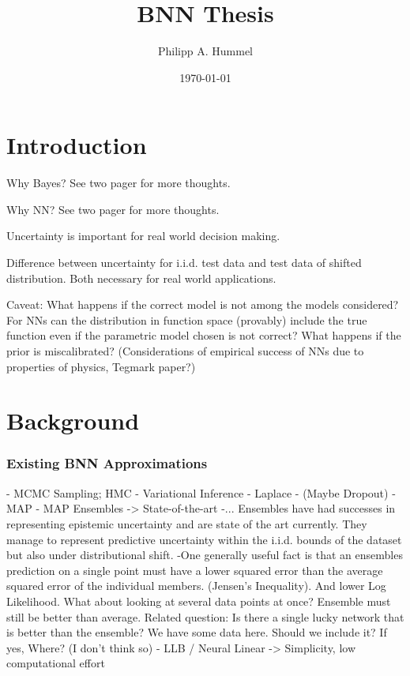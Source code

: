 \documentclass[12pt, A4, twoside]{report}
\title{BNN Thesis}
\author{Philipp A. Hummel}
\date{\today}
\begin{document}
\begin{titlepage}
\maketitle
\end{titlepage}

\chapter{Introduction}
Why Bayes? See two pager for more thoughts.

Why NN? See two pager for more thoughts.

Uncertainty is important for real world decision making.

Difference between uncertainty for i.i.d. test data and test data of shifted distribution. Both necessary for real world applications.

Caveat: What happens if the correct model is not among the models considered? For NNs can the distribution in function space (provably) include the true function even if the parametric model chosen is not correct? What happens if the prior is miscalibrated? (Considerations of empirical success of NNs due to properties of physics, Tegmark paper?)


\chapter{Background}
\subsection{Existing BNN Approximations}
- MCMC Sampling; HMC 
- Variational Inference 
- Laplace
- (Maybe Dropout)
- MAP
- MAP Ensembles -> State-of-the-art
    -... Ensembles have had successes in representing epistemic uncertainty and are state of the art currently. They manage to represent predictive uncertainty within the i.i.d. bounds of the dataset but also under distributional shift.
    -One generally useful fact is that an ensembles prediction on a single point must have a lower squared error than the average squared error of the individual members. (Jensen's Inequality). And lower Log Likelihood.
    What about looking at several data points at once? Ensemble must still be better than average.
    Related question: Is there a single lucky network that is better than the ensemble? 
    We have some data here. Should we include it? If yes, Where? (I don't think so)
- LLB / Neural Linear -> Simplicity, low computational effort
\end{document}
